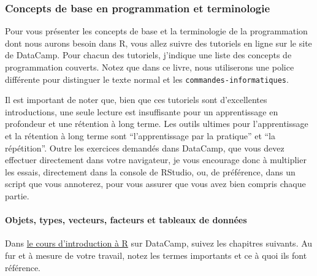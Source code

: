 \documentclass[
  a4paper,
]{article}
\begin{document}
\hypertarget{concepts-de-base-en-programmation-et-terminologie}{%
\subsubsection{Concepts de base en programmation et terminologie}\label{concepts-de-base-en-programmation-et-terminologie}}

Pour vous présenter les concepts de base et la terminologie de la programmation dont nous aurons besoin dans R, vous allez suivre des tutoriels en ligne sur le site de DataCamp. Pour chacun des tutoriels, j'indique une liste des concepts de programmation couverts. Notez que dans ce livre, nous utiliserons une police différente pour distinguer le texte normal et les \texttt{commandes-informatiques}.

Il est important de noter que, bien que ces tutoriels sont d'excellentes introductions, une seule lecture est insuffisante pour un apprentissage en profondeur et une rétention à long terme. Les outils ultimes pour l'apprentissage et la rétention à long terme sont ``l'apprentissage par la pratique'' et ``la répétition''. Outre les exercices demandés dans DataCamp, que vous devez effectuer directement dans votre navigateur, je vous encourage donc à multiplier les essais, directement dans la console de RStudio, ou, de préférence, dans un script que vous annoterez, pour vous assurer que vous avez bien compris chaque partie.

\hypertarget{objects}{%
\paragraph{Objets, types, vecteurs, facteurs et tableaux de données}\label{objects}}

Dans \href{https://www.datacamp.com/community/open-courses/introduction-a-r}{le cours d'introduction à R} sur DataCamp, suivez les chapitres suivants. Au fur et à mesure de votre travail, notez les termes importants et ce à quoi ils font référence.
\end{document}
